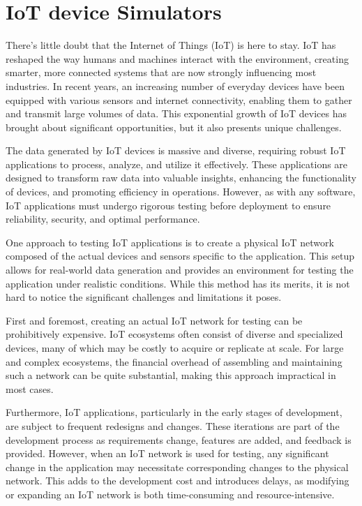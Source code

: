 \section{IoT device Simulators}

There's little doubt that the Internet of Things (IoT) is here to stay. IoT has reshaped the way humans and machines interact with the environment, creating smarter, more connected systems that are now strongly influencing most industries. In recent years, an increasing number of everyday devices have been equipped with various sensors and internet connectivity, enabling them to gather and transmit large volumes of data. This exponential growth of IoT devices has brought about significant opportunities, but it also presents unique challenges.

The data generated by IoT devices is massive and diverse, requiring robust IoT applications to process, analyze, and utilize it effectively. These applications are designed to transform raw data into valuable insights, enhancing the functionality of devices, and promoting efficiency in operations. However, as with any software, IoT applications must undergo rigorous testing before deployment to ensure reliability, security, and optimal performance.

One approach to testing IoT applications is to create a physical IoT network composed of the actual devices and sensors specific to the application. This setup allows for real-world data generation and provides an environment for testing the application under realistic conditions. While this method has its merits, it is not hard to notice the significant challenges and limitations it poses.

First and foremost, creating an actual IoT network for testing can be prohibitively expensive. IoT ecosystems often consist of diverse and specialized devices, many of which may be costly to acquire or replicate at scale. For large and complex ecosystems, the financial overhead of assembling and maintaining such a network can be quite substantial, making this approach impractical in most cases.

Furthermore, IoT applications, particularly in the early stages of development, are subject to frequent redesigns and changes. These iterations are part of the development process as requirements change, features are added, and feedback is provided. However, when an IoT network is used for testing, any significant change in the application may necessitate corresponding changes to the physical network. This adds to the development cost and introduces delays, as modifying or expanding an IoT network is both time-consuming and resource-intensive.

